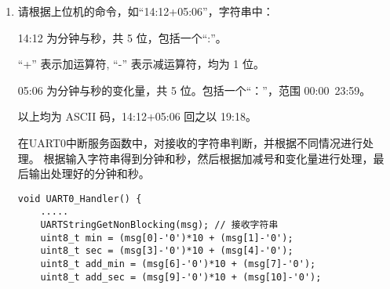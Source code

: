 \documentclass[12pt, a4paper, oneside]{ctexart}
\begin{document}
\begin{enumerate}[listparindent=2em]
        {\kaishu 在UART0中断服务函数中，以非阻塞方式接收字符，
        并进行判断，以确定对应的月份和月份增加数。}

        \begin{lstlisting}[language=C++]
void UART0_Handler() {
    .....
    UARTStringGetNonBlocking(msg); // 接收字符串
    for (int i=0;i<12;i++) {
        if (strncmp(msg, month[i], 3) == 0) {
            mouth = i;
            break;
        }
        if (i==11) {
            UARTStringPutNonBlocking("Invalid month!\n");
            return;
        }
    }
    
    // 确定增加的月份
    if (msg[3] == '+') { 
        add = (msg[4]-'0')*10 + (msg[5]-'0');
        mouth += add;
        mouth %= 12; // 防止超界
    } else if (msg[3] == '-') {
        add = (msg[4]-'0')*10 + (msg[5]-'0');
        mouth -= add;
        mouth = (mouth+12)%12; // 防止超界
    } else {
        UARTStringPutNonBlocking("Invalid command!\n");
        return;
    }

    UARTStringPutNonBlocking(month[mouth]); // 输出处理好的月份


}

    \end{lstlisting}
    
    \item 请根据上位机的命令，如“14:12+05:06”，字符串中：
    
    14:12 为分钟与秒，共 5 位，包括一个“:”。

    “+” 表示加运算符, “-” 表示减运算符，均为 1 位。

    05:06 为分钟与秒的变化量，共 5 位。包括一个“：”，范围 00:00~23:59。

    以上均为 ASCII 码，14:12+05:06 回之以 19:18。

    {\kaishu 在UART0中断服务函数中，对接收的字符串判断，并根据不同情况进行处理。
    根据输入字符串得到分钟和秒，然后根据加减号和变化量进行处理，最后输出处理好的分钟和秒。}

    \begin{lstlisting}
void UART0_Handler() {
    .....
    UARTStringGetNonBlocking(msg); // 接收字符串
    uint8_t min = (msg[0]-'0')*10 + (msg[1]-'0');
    uint8_t sec = (msg[3]-'0')*10 + (msg[4]-'0');
    uint8_t add_min = (msg[6]-'0')*10 + (msg[7]-'0');
    uint8_t add_sec = (msg[9]-'0')*10 + (msg[10]-'0');


\end{lstlisting}
\end{enumerate}
\end{document}
